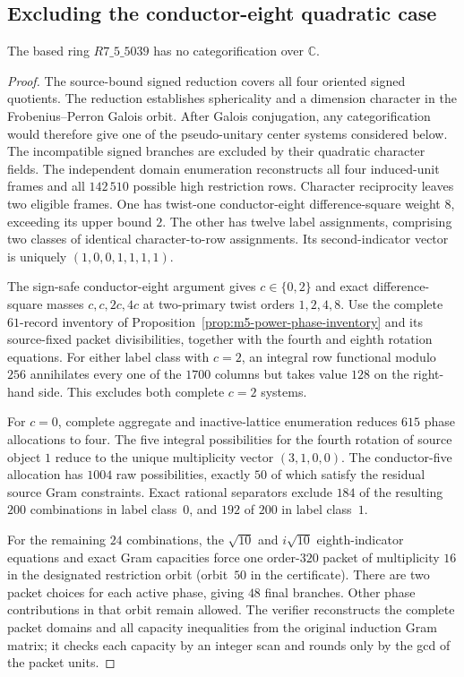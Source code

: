 \subsection{Excluding the conductor-eight quadratic case}
\label{sec:m5-cyclic-application}
\begin{proposition}
\label{prop:m5-5039-cyclic-exclusion}
The based ring $R7\_5\_5039$ has no categorification over $\mathbb C$.
\end{proposition}
\begin{proof}
The source-bound signed reduction covers all four oriented signed
quotients. The reduction establishes sphericality and a dimension
character in the Frobenius--Perron Galois orbit. After Galois
conjugation, any categorification would therefore give one of the
pseudo-unitary center systems considered below. The incompatible
signed branches are excluded by their quadratic character fields.
The independent domain enumeration reconstructs all four induced-unit
frames and all $142\,510$ possible high restriction rows. Character
reciprocity leaves two eligible frames. One has twist-one
conductor-eight difference-square weight $8$, exceeding its upper
bound $2$. The other has twelve label assignments, comprising two
classes of identical character-to-row assignments. Its second-indicator
vector is uniquely $(1,0,0,1,1,1,1)$.

The sign-safe conductor-eight argument gives $c\in\{0,2\}$ and
exact difference-square masses $c,c,2c,4c$ at two-primary twist
orders $1,2,4,8$. Use the complete $61$-record inventory of
Proposition~\ref{prop:m5-power-phase-inventory} and its source-fixed
packet divisibilities, together with the fourth and eighth rotation
equations. For either label class with $c=2$, an integral row
functional modulo $256$ annihilates every one of the $1700$ columns
but takes value $128$ on the right-hand side. This excludes both
complete $c=2$ systems.

For $c=0$, complete aggregate and inactive-lattice enumeration reduces
$615$ phase allocations to four. The five integral possibilities for
the fourth rotation of source object $1$ reduce to the unique
multiplicity vector $(3,1,0,0)$. The conductor-five allocation has
$1004$ raw possibilities, exactly $50$ of which satisfy the residual
source Gram constraints. Exact rational separators exclude $184$ of
the resulting $200$ combinations in label class~$0$, and $192$ of
$200$ in label class~$1$.

For the remaining $24$ combinations, the $\sqrt{10}$ and
$i\sqrt{10}$ eighth-indicator equations and exact Gram capacities
force one order-$320$ packet of multiplicity $16$ in the designated
restriction orbit (orbit~$50$ in the certificate). There are two
packet choices for each active phase, giving $48$ final branches.
Other phase contributions in that orbit remain allowed. The verifier
reconstructs the complete packet domains and all capacity inequalities
from the original induction Gram matrix; it checks each capacity by
an integer scan and rounds only by the gcd of the packet units.


\end{proof}
